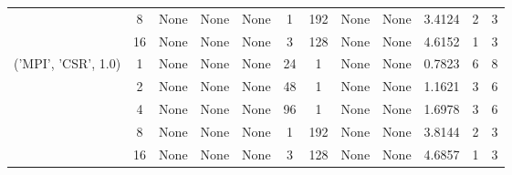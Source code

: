 \begin{tabular}{cccccccccccc}
& 8& None& None& None& 1& 192& None& None& 3.4124& 2& 3\\
& 16& None& None& None& 3& 128& None& None& 4.6152& 1& 3\\
\hline
\multirow{5}{*}{('MPI', 'CSR', 1.0)}& 1& None& None& None& 24& 1& None& None& 0.7823& 6& 8\\
& 2& None& None& None& 48& 1& None& None& 1.1621& 3& 6\\
& 4& None& None& None& 96& 1& None& None& 1.6978& 3& 6\\
& 8& None& None& None& 1& 192& None& None& 3.8144& 2& 3\\
& 16& None& None& None& 3& 128& None& None& 4.6857& 1& 3\\
\hline
\end{tabular}
